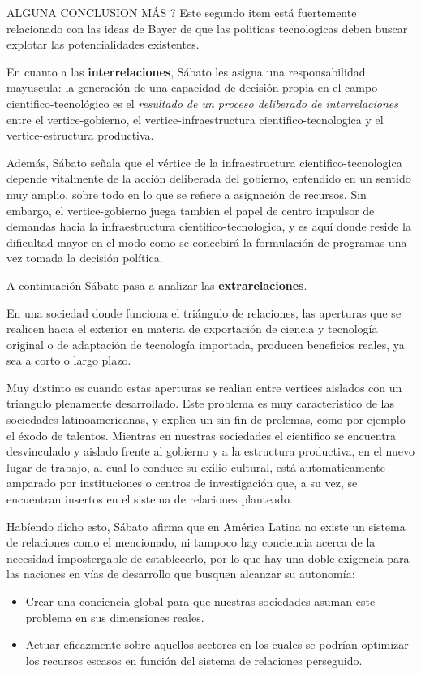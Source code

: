 ALGUNA CONCLUSION MÁS ?
Este segundo item está fuertemente relacionado con las ideas de Bayer de que las politicas tecnologicas deben buscar explotar las potencialidades existentes.

\vspace{0.5em}

En cuanto a las \textbf{interrelaciones}, Sábato les asigna una responsabilidad mayuscula: la generación de una capacidad de decisión propia en el campo cientifico-tecnológico es el \textit{resultado de un proceso deliberado de interrelaciones} entre el vertice-gobierno, el vertice-infraestructura cientifico-tecnologica y el vertice-estructura productiva.

Además, Sábato señala que el vértice de la infraestructura cientifico-tecnologica depende vitalmente de la acción deliberada del gobierno, entendido en un sentido muy amplio, sobre todo en lo que se refiere a asignación de recursos. Sin embargo, el vertice-gobierno juega tambien el papel de centro impulsor de demandas hacia la infraestructura cientifico-tecnologica, y es aquí donde reside la dificultad mayor en el modo como se concebirá la formulación de programas una vez tomada la decisión política.

\vspace{0.5em}

A continuación Sábato pasa a analizar las \textbf{extrarelaciones}.

En una sociedad donde funciona el triángulo de relaciones, las aperturas que se realicen hacia el exterior en materia de exportación de ciencia y tecnología original o de adaptación de tecnología importada, producen beneficios reales, ya sea a corto o largo plazo.

Muy distinto es cuando estas aperturas se realian entre vertices aislados con un triangulo plenamente desarrollado. Este problema es muy caracteristico de las sociedades latinoamericanas, y explica un sin fin de prolemas, como por ejemplo el éxodo de talentos. Mientras en nuestras sociedades el cientifico se encuentra desvinculado y aislado frente al gobierno y a la estructura productiva, en el nuevo lugar de trabajo, al cual lo conduce su exilio cultural, está automaticamente amparado por instituciones o centros de investigación que, a su vez, se encuentran insertos en el sistema de relaciones planteado.

\vspace{0.5em}

Habíendo dicho esto, Sábato afirma que en América Latina no existe un sistema de relaciones como el mencionado, ni tampoco hay conciencia acerca de la necesidad impostergable de establecerlo, por lo que hay una doble exigencia para las naciones en vías de desarrollo que busquen alcanzar su autonomía:
\begin{itemize}
    \item Crear una conciencia global para que nuestras sociedades asuman este problema en sus dimensiones reales.
    \item Actuar eficazmente sobre aquellos sectores en los cuales se podrían optimizar los recursos escasos en función del sistema de relaciones perseguido.
\end{itemize}

